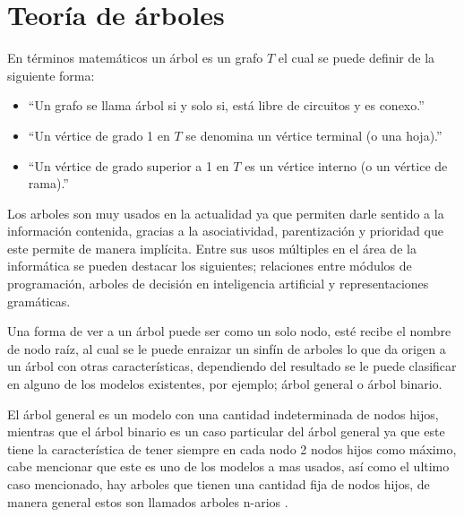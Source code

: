 \section{Teor\'ia de \'arboles}
En t\'erminos matem\'aticos un \'arbol es un grafo $T$ el cual se puede definir de
 la siguiente forma\cite{SUSANNAS.EPP2012}:

\begin{itemize}
	\item ``Un grafo se llama \'arbol si y solo si, est\'a libre de circuitos y
	 es conexo.''
	\item ``Un v\'ertice de grado 1 en $T$ se denomina un v\'ertice terminal (o
	 una hoja).''
	\item ``Un v\'ertice de grado superior a 1 en $T$ es un v\'ertice interno (o
	 un v\'ertice de rama).''
\end{itemize}

Los arboles son muy usados en la actualidad ya que permiten  darle sentido a
 la informaci\'on contenida, gracias a la asociatividad, parentizaci\'on y
 prioridad que este permite de manera impl\'icita. Entre sus usos m\'ultiples en
 el \'area de la inform\'atica se pueden destacar los  siguientes; relaciones
 entre m\'odulos de programaci\'on, arboles de decisi\'on en inteligencia artificial
 y representaciones gram\'aticas\cite{gutierrez1999estructuras}.  

Una forma de ver a un \'arbol puede ser como un solo nodo, est\'e recibe el nombre
 de  nodo ra\'iz, al cual se le puede enraizar un sinf\'in de arboles lo que da
 origen  a un \'arbol con otras caracter\'isticas, dependiendo del resultado se le
 puede clasificar en alguno de los modelos existentes, por ejemplo; \'arbol 
 general o \'arbol binario\cite{gutierrez1999estructuras}. 

El \'arbol general es un modelo con una cantidad indeterminada de nodos hijos,
 mientras que el \'arbol binario es un caso particular del \'arbol general ya que
 este tiene la caracter\'istica de tener siempre en cada nodo 2 nodos hijos como
 m\'aximo, cabe mencionar que este es uno de los modelos a mas usados, as\'i como
 el ultimo caso mencionado, hay arboles que tienen una cantidad fija de nodos
 hijos, de manera general estos son llamados arboles n-arios
 \cite{gutierrez1999estructuras}.